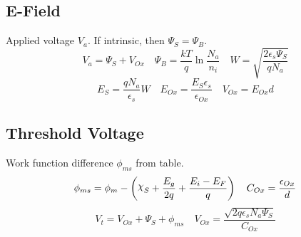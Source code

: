 \documentclass[a4paper, fontsize=8pt, landscape, DIV=1]{scrartcl}
\begin{document}
\begin{multicols*}{4}
    \subsection{E-Field}
    Applied voltage $V_a$. If intrinsic, then $\Psi_S = \Psi_B$.
    \[ V_a = \Psi_S + V_{Ox} \quad \Psi_B = \frac{kT}{q}\ln\frac{N_a}{n_i} \quad W=\sqrt{\frac{2\epsilon_s\Psi_S}{qN_a}}\]
    \[ E_S = \frac{qN_a}{\epsilon_s}W \quad E_{Ox}=\frac{E_S\epsilon_s}{\epsilon_{Ox}} \quad V_{Ox} = E_{Ox}d \]

    \subsection{Threshold Voltage}
    Work function difference $\phi_{ms}$ from table.
    \[ \phi_{ms} = \phi_m - \left(\altchi_S + \frac{E_g}{2q} + \frac{E_i-E_F}{q}\right)  \quad C_{Ox} = \frac{\epsilon_{Ox}}{d} \]
    \[ V_t = V_{Ox} + \Psi_S + \phi_{ms} \quad V_{Ox} = \frac{\sqrt{2q\epsilon_s N_a \Psi_S}}{C_{Ox}} \]




\end{multicols*}

\setcounter{secnumdepth}{2}
\end{document}
